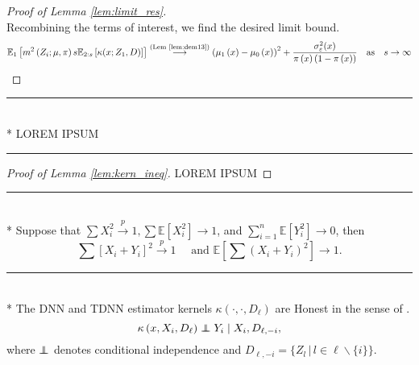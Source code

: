\begin{proof}[Proof of Lemma \ref{lem:limit_res}]
\begin{equation}
	\end{equation}
	Recombining the terms of interest, we find the desired limit bound.
	\begin{equation}
		\begin{aligned}
			\mathbb{E}_{1}\left[m^2\left(Z_{i}; \mu, \pi\right) s \mathbb{E}_{2:s}\left[\kappa(x; Z_1, D)\right]\right]
			\overset{\text{(Lem \ref{lem:dem13})}}{\longrightarrow} \left(\mu_1\left(x\right) - \mu_0\left(x\right)\right)^2 + \frac{\sigma_{\varepsilon}^2(x)}{\pi\left(x\right)\left(1 - \pi\left(x\right)\right)}
			\quad \text{as} \quad s \rightarrow \infty
		\end{aligned}
	\end{equation}
\end{proof}

\hrule

\begin{lem}\label{lem:kern_ineq}\mbox{}\\*
	{\color{red} LOREM IPSUM}
\end{lem}

\hrule

\begin{proof}[Proof of Lemma \ref{lem:kern_ineq}]
	{\color{red} LOREM IPSUM}
\end{proof}

\hrule

\begin{lem}\label{lem:peng1}\mbox{}\\*
	Suppose that $\sum X_{i}^2 \xrightarrow{p} 1, \sum \mathbb{E}\left[X_{i}^2\right] \rightarrow 1$, and $\sum_{i=1}^n \mathbb{E}\left[Y_{i}^2\right] \rightarrow 0$, then
	\begin{equation}
		\sum\left[X_{i}+Y_{i}\right]^2 \xrightarrow{p} 1 \quad \text { and } \mathbb{E}\left[\sum\left(X_{i}+Y_{i}\right)^2\right] \rightarrow 1.
	\end{equation}
\end{lem}

\hrule

\begin{lem}\label{lem:honesty}\mbox{}\\*
	The DNN and TDNN estimator kernels $\kappa\left(\cdot, \cdot, D_{\ell}\right)$ are Honest in the sense of \citet{wager_estimation_2018}.
	\begin{equation*}
		\kappa\left(x, X_{i}, D_{\ell}\right) \perp\!\!\!\!\perp Y_{i} \mid X_{i}, D_{\ell,-i},
	\end{equation*}
	where $\perp\!\!\!\!\perp$ denotes conditional independence and $D_{\ell,-i} = \{Z_l \, | \, l \in \ell \backslash \{i\}\}$.
\end{lem}
